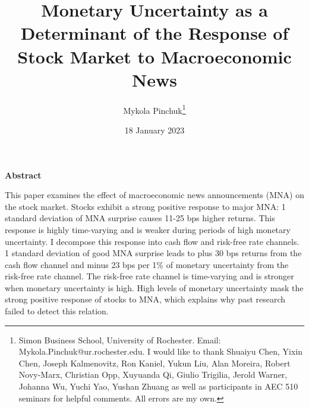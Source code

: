 \documentclass[12pt]{article}
\begin{document}
\onehalfspacing      %
\renewcommand{\footnote}{\endnote}  %

\author{\large{Mykola Pinchuk}\thanks{\rm Simon Business School, University of Rochester. Email: Mykola.Pinchuk@ur.rochester.edu. \newline I would like to thank Shuaiyu Chen, Yixin Chen, Joseph Kalmenovitz, Ron Kaniel, Yukun Liu, Alan Moreira, Robert Novy-Marx, Christian Opp, Xuyuanda Qi, Giulio Trigilia, Jerold Warner, Johanna Wu, Yuchi Yao, Yushan Zhuang as well as participants in AEC 510 seminars for helpful comments. All errors are my own.}}

\title{\bf Monetary Uncertainty as a Determinant of the Response of Stock Market to Macroeconomic News}

\date{18 January 2023}  

\maketitle
\thispagestyle{empty}

\bigskip

\normalsize

\vspace{1cm}

\centerline{\bf Abstract}

\vspace{0.5cm}

\begin{onehalfspace}  %
  \noindent This paper examines the effect of macroeconomic news announcements (MNA) on the stock market. Stocks exhibit a strong positive response to major MNA: 1 standard deviation of MNA surprise causes 11-25 bps higher returns. This response is highly time-varying and is weaker during periods of high monetary uncertainty. I decompose this response into cash flow and risk-free rate channels. 1 standard deviation of good MNA surprise leads to plus 30 bps returns from the cash flow channel and minus 23 bps per 1\% of monetary uncertainty from the risk-free rate channel. The risk-free rate channel is time-varying and is stronger when monetary uncertainty is high. High levels of monetary uncertainty mask the strong positive response of stocks to MNA, which explains why past research failed to detect this relation.  
\end{onehalfspace}
\medskip
\end{document}
